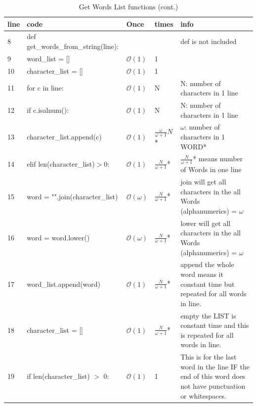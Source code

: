 \documentclass{article}
\begin{document}
    \begin{table}[H]
        \begin{center}
            \caption*{Get Words List functions (cont.)}
            \begin{tabular}{l|l|l|l|p{5cm}}
                \hline
                line & code & Once & times & info\\
                \hline
                8 & def get\_words\_from\_string(line): & & & def is not included\\
                \hline
                9 & word\_list = [] & $\mathcal{O}(1)$& 1 &\\
                \hline
                10 & character\_list = [] &$\mathcal{O}(1)$& 1 &\\
                \hline
                11 & for c in line: &$\mathcal{O}(1)$& N & N: number of characters in 1 line\\
                \hline
                12 & if c.isalnum(): &$\mathcal{O}(1)$& N & N: number of characters in 1 line\\
                \hline
                13 & character\_list.append(c) &$\mathcal{O}(1)$& $\frac{\omega}{\omega +1}N$* & $\omega$: number of characters in 1 WORD*\\
                \hline
                14 & elif len(character\_list)$>$0: &$\mathcal{O}(1)$& $\frac{N}{\omega +1}$* & $\frac{N}{\omega +1}$* means number of Words in one line\\
                \hline
                15 & word = "".join(character\_list) &$\mathcal{O}(\omega)$& $\frac{N}{\omega +1}$* & join will get all characters in the all Words (alphanumerics) = $\omega$\\
                \hline
                16 & word = word.lower() &$\mathcal{O}(\omega)$& $\frac{N}{\omega +1}$* & lower will get all characters in the all Words (alphanumerics) = $\omega$\\
                \hline
                17 & word\_list.append(word) &$\mathcal{O}(1)$& $\frac{N}{\omega +1}$* & append the whole word means it constant time but repeated for all words in line.\\
                \hline
                18 & character\_list = [] &$\mathcal{O}(1)$& $\frac{N}{\omega +1}$* & empty the LIST is constant time and this is repeated for all words in line.\\
                \hline
                19 & if len(character\_list) $>$ 0: &$\mathcal{O}(1)$& 1 & This is for the last word in the line IF the end of this word does not have punctuation or whitespaces.\\

\end{tabular}
\end{center}
\end{table}
\end{document}
